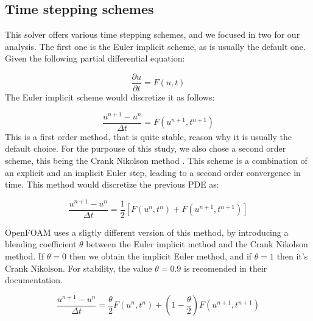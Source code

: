 \documentclass[
  english,        %
  font=times,     %
  onecolumn,      %
]{tumarticle}
\begin{document}
\subsection{Time stepping schemes}\label{sec:euler}
This solver offers various time stepping schemes, and we focused in two for our analysis. The first one is the Euler implicit scheme, as is usually the default one. Given the following partial differential equation:

\begin{equation}
    \frac{\partial u}{\partial t} = F(u, t)
\end{equation}
The Euler implicit scheme would discretize it as follows:

\begin{equation}
    \frac{u^{n+1} - u^n}{\Delta t} = {F}(u^{n+1}, t^{n+1})
\end{equation}
This is a first order method, that is quite stable, reason why it is usually the default choice. For the purpouse of this study, we also chose a second order scheme, this being the Crank Nikolson method \cite{crank1947practical}. This scheme is a combination of an explicit and an implicit Euler step, leading to a second order convergence in time. This method would discretize the previous PDE as: 

\begin{equation}
    \frac{u^{n+1} - u^n}{\Delta t} = \frac{1}{2} \left[F(u^n, t^n) +  F(u^{n+1}, t^{n+1}) \right]
\end{equation}


OpenFOAM uses a sligtly different version of this method, by introducing a blending coefficient $\theta$ between the Euler implicit method and the Crank Nikolson method. If $\theta = 0$ then we obtain the implicit Euler method, and if $\theta = 1$ then it's Crank Nikolson. For stability, the value $\theta = 0.9$ is recomended in their documentation.

\begin{equation}
    \frac{u^{n+1} - u^n}{\Delta t} = \frac{\theta}{2} F(u^{n}, t^{n}) + \left( 1 - \frac{\theta}{2} \right) F(u^{n+1}, t^{n+1})
\end{equation}



\end{document}

